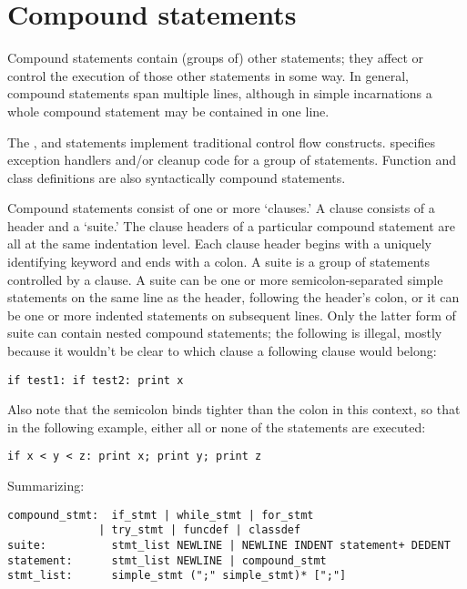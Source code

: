 \chapter{Compound statements\label{compound}}

Compound statements contain (groups of) other statements; they affect
or control the execution of those other statements in some way.  In
general, compound statements span multiple lines, although in simple
incarnations a whole compound statement may be contained in one line.

The ,  and  statements implement
traditional control flow constructs.   specifies exception
handlers and/or cleanup code for a group of statements.  Function and
class definitions are also syntactically compound statements.

Compound statements consist of one or more `clauses.'  A clause
consists of a header and a `suite.'  The clause headers of a
particular compound statement are all at the same indentation level.
Each clause header begins with a uniquely identifying keyword and ends
with a colon.  A suite is a group of statements controlled by a
clause.  A suite can be one or more semicolon-separated simple
statements on the same line as the header, following the header's
colon, or it can be one or more indented statements on subsequent
lines.  Only the latter form of suite can contain nested compound
statements; the following is illegal, mostly because it wouldn't be
clear to which  clause a following  clause would
belong:

\begin{verbatim}
if test1: if test2: print x
\end{verbatim}

Also note that the semicolon binds tighter than the colon in this
context, so that in the following example, either all or none of the
 statements are executed:

\begin{verbatim}
if x < y < z: print x; print y; print z
\end{verbatim}

Summarizing:

\begin{verbatim}
compound_stmt:  if_stmt | while_stmt | for_stmt
              | try_stmt | funcdef | classdef
suite:          stmt_list NEWLINE | NEWLINE INDENT statement+ DEDENT
statement:      stmt_list NEWLINE | compound_stmt
stmt_list:      simple_stmt (";" simple_stmt)* [";"]
\end{verbatim}

